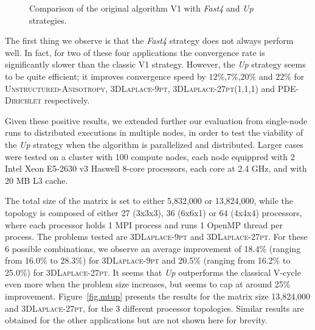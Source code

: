 \begin{figure}
    \caption{Comparison of the original algorithm V1 with \emph{Fast4} and \emph{Up} strategies.}
    \label{fig.up_comparison}
\end{figure}

The first thing we observe is that the \emph{Fast4} strategy does not
always perform well. In fact, for two of these four applications the
convergence rate is significantly slower than the classic V1 strategy.
However, the \emph{Up} strategy seems to be quite efficient; it improves
convergence speed by $12\%$,$7\%$,$20\%$ and $22\%$ for
\textsc{Unstructured-Anisotropy}, \textsc{3DLaplace-9pt},
\textsc{3DLaplace-27pt(1,1,1)} and \textsc{PDE-Dirichlet} respectively.

Given these positive results, we extended further our evaluation from
single-node runs to distributed executions in multiple nodes, in order to test
the viability of the \emph{Up} strategy when the algorithm is parallelized and
distributed. Larger cases were tested on a cluster with 100 compute nodes, 
each node equippred with 2 Intel Xeon E5-2630 v3 Haswell 8-core processors, 
each core at 2.4 GHz, and with 20 MB L3 cache.

The total size of the matrix is set to either 5,832,000 or 13,824,000, while
the topology is composed of either 27 (3x3x3), 36 (6x6x1) or 64 (4x4x4)
processors, where each processor holds 1 MPI process and runs 1 OpenMP
thread per process. The problems tested are \textsc{3DLaplace-9pt} and
\textsc{3DLaplace-27pt}.  For these 6 possible combinations, we observe an
average improvement of 18.4\% (ranging from 16.0\% to 28.3\%) for
\textsc{3DLaplace-9pt} and 20.5\% (ranging from 16.2\% to 25.0\%) for
\textsc{3DLaplace-27pt}. It seems that \emph{Up} outperforms the
classical V-cycle even more when the problem size increases, but seems to cap at around
25\% improvement. Figure~\ref{fig.mtup} presents the results for the matrix
size 13,824,000 and \textsc{3DLaplace-27pt}, for the 3 different processor
topologies. Similar results are obtained for the other applications but are not
shown here for brevity.

